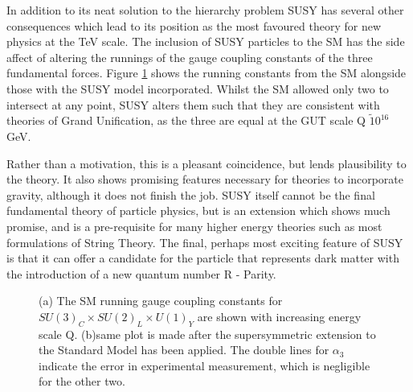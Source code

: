 In addition to its neat solution to the hierarchy problem SUSY has several other consequences which lead to its position as the most favoured theory for new physics at the TeV scale. The inclusion of SUSY particles to the SM has the side affect of altering the runnings of the gauge coupling constants of the three fundamental forces. Figure \ref{fig:couple} shows the running constants from the SM alongside those with the SUSY model incorporated. Whilst the SM allowed only two to intersect at any point, SUSY alters them such that they are consistent with theories of Grand Unification, as the three are equal at the GUT scale Q $\tilde 10^{16}$ GeV. 

Rather than a motivation, this is a pleasant coincidence, but lends plausibility to the theory. It also shows promising features necessary for theories to incorporate gravity, although it does not finish the job. SUSY itself cannot be the final fundamental theory of particle physics, but is an extension which shows much promise, and is a pre-requisite for many higher energy theories such as most formulations of String Theory\cite{Dine}. The final, perhaps most exciting feature of SUSY is that it can offer a candidate for the particle that represents dark matter with the introduction of a new quantum number R - Parity. 

\begin{figure}
\centering
{}
\caption{\label{fig:couple}(a) The SM running gauge coupling constants for $SU(3)_{C} \times SU(2)_{L} \times U(1)_{Y}$ are shown with increasing energy scale Q. (b)same plot is made after the supersymmetric extension to the Standard Model has been applied. The double lines for $\alpha_{3}$ indicate the error in experimental  measurement, which is negligible for the other two.~\cite{PeskinBSM}}
\end{figure}



